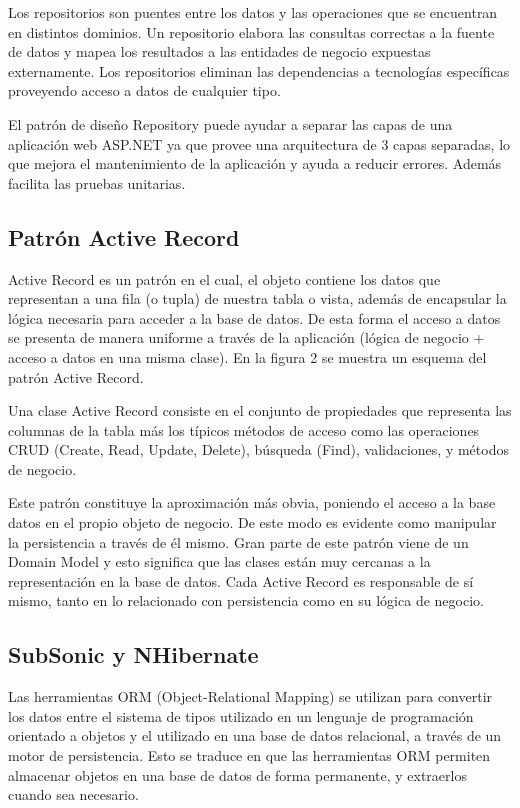\documentclass[preprint,12pt]{elsarticle}
\begin{document}
Los repositorios son puentes entre los datos y las operaciones que se encuentran en distintos dominios. Un repositorio elabora las consultas correctas a la fuente de datos y mapea los resultados a las entidades de negocio expuestas externamente. Los repositorios eliminan las dependencias a tecnologías específicas proveyendo acceso a datos de cualquier tipo.\cite{referenciaQuispe1}

El patrón de diseño Repository puede ayudar a separar las capas de una aplicación web ASP.NET ya que provee una arquitectura de 3 capas separadas, lo que mejora el mantenimiento de la aplicación y ayuda a reducir errores. Además facilita las pruebas unitarias.

\subsection{Patrón Active Record}
Active Record es un patrón en el cual, el objeto contiene los datos que representan a una fila (o tupla) de nuestra tabla o vista, además de encapsular la lógica necesaria para acceder a la base de datos. De esta forma el acceso a datos se presenta de manera uniforme a través de la aplicación (lógica de negocio + acceso a datos en una misma clase). En la figura 2 se muestra un esquema del patrón Active Record.

Una clase Active Record consiste en el conjunto de propiedades que representa las columnas de la tabla más los típicos métodos de acceso como las operaciones CRUD (Create, Read, Update, Delete), búsqueda (Find), validaciones, y métodos de negocio.\cite{referenciaQuispe2}

Este patrón constituye la aproximación más obvia, poniendo el acceso a la base datos en el propio objeto de negocio. De este modo es evidente como manipular la persistencia a través de él mismo. Gran parte de este patrón viene de un Domain Model y esto significa que las clases están muy cercanas a la representación en la base de datos. Cada Active Record es responsable de sí mismo, tanto en lo
relacionado con persistencia como en su lógica de negocio.\cite{referenciaQuispe3}

\subsection{SubSonic y NHibernate}
Las herramientas ORM (Object-Relational Mapping) se utilizan para convertir los datos entre el sistema de tipos utilizado en un lenguaje de programación orientado a objetos y el utilizado en una base de datos relacional, a través de un motor de persistencia. Esto se traduce en que las herramientas ORM permiten almacenar objetos en una base de datos de forma permanente, y extraerlos cuando sea
necesario.
\end{document}
